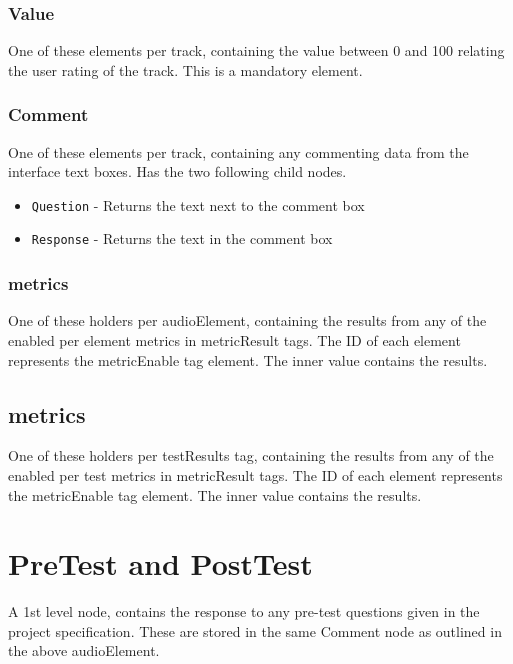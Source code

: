 \documentclass{article}
\begin{document}
\subsubsection{Value}
One of these elements per track, containing the value between 0 and 100 relating the user rating of the track. This is a mandatory element.

\subsubsection{Comment}
One of these elements per track, containing any commenting data from the interface text boxes. Has the two following child nodes.
\begin{itemize}
\item \texttt{Question} - Returns the text next to the comment box
\item \texttt{Response} - Returns the text in the comment box
\end{itemize}

\subsubsection{metrics}
One of these holders per audioElement, containing the results from any of the enabled per element metrics in metricResult tags. The ID of each element represents the metricEnable tag element. The inner value contains the results.


\subsection{metrics}
One of these holders per testResults tag, containing the results from any of the enabled per test metrics in metricResult tags. The ID of each element represents the metricEnable tag element. The inner value contains the results.


\section{PreTest and PostTest}
A 1st level node, contains the response to any pre-test questions given in the project specification. These are stored in the same Comment node as outlined in the above audioElement.
\end{document}
